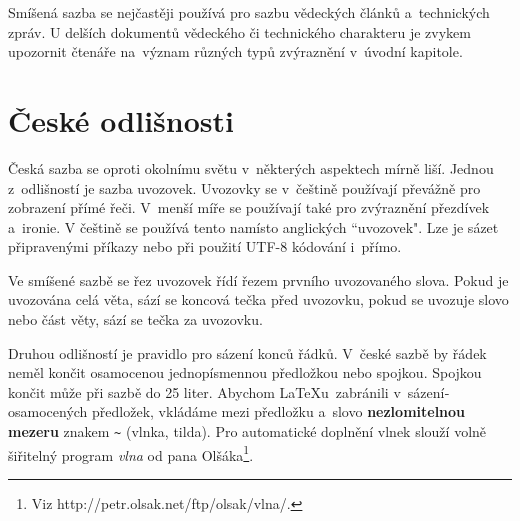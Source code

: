 \documentclass[a4paper, 11pt, twocolumn] {article}
\begin{document}
Smíšená sazba se nejčastěji používá pro sazbu vě\-de\-ckých článků a~technických zpráv. U delší­ch do\-ku\-men\-tů vědeckého či technického charakteru je zvykem upozornit čtenáře na~význam různých typů zvý\-raz\-ně\-ní­ v~úvodní­ kapitole.

\section{České odlišnosti}

Česká sazba se oproti okolní­mu světu v~některých as\-pe\-ktech mí­rně liší­. Jednou z~odlišností je sazba uvozovek. Uvozovky se v~češtině použí­vají­ převážně pro zobrazení­ pří­mé řeči. V~menší­ míře se použí­vají­ také pro zvýraznění­ přezdí­vek a~ironie. V češtině se použí­vá tento \textbf{} namí­sto anglických ``uvozovek". Lze je sázet připravenými příkazy nebo při použití UTF-8 kódování i~přímo.

Ve smíšené sazbě se řez uvozovek ří­dí­ řezem prv\-ního uvozovaného slova. Pokud je uvozována celá věta, sází­ se koncová tečka před uvozovku, pokud se uvozuje slovo nebo část věty, sází­ se tečka za uvozovku.

Druhou odlišností je pravidlo pro sázení­ konců řád\-ků. V~české sazbě by řádek neměl končit
osamocenou jednopí­smennou předložkou nebo spojkou. Spoj\-kou  končit může při sazbě
do 25 liter. Abychom \LaTeX u\ zabránili v~sázení­ osamocených předložek, vkládáme mezi předložku
a~slovo \textbf{nezlomitelnou me\-ze\-ru} znakem \verb|~| (vlnka, tilda). Pro automatické
do\-pl\-ně\-ní vlnek slouží­ volně šiřitelný program \emph{vlna} od pana Olšáka\footnote{Viz http://petr.olsak.net/ftp/olsak/vlna/.}.
\end{document}
